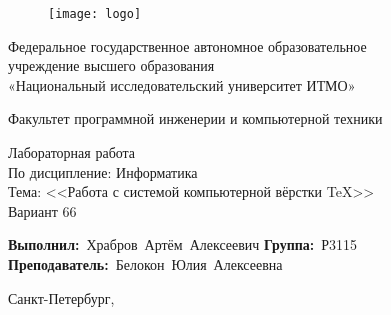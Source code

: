 \newcommand{\Faculty}{Факультет программной инженерии и компьютерной техники}
\newcommand{\TeacherName}{Белокон Юлия Алексеевна}

\newcommand{\LabSubject}{Информатика}
\newcommand{\LabNumber}{\textnumero 6}
\newcommand{\LabName}{Работа с системой компьютерной вёрстки \TeX}
\newcommand{\Variant}{66}

\newcommand{\StudentGroup}{Р3115}
\newcommand{\StudentName}{Храбров Артём Алексеевич}


\thispagestyle{empty}

\begin{figure}[h]
	\centering
	\texttt{[image: logo]}
\end{figure}
\vspace{-\baselineskip}


\begin{center}
	Федеральное государственное автономное образовательное \\
	учреждение высшего образования\\
	«Национальный исследовательский университет ИТМО»
\end{center}\par

\begin{center}
	\vspace{12pt}
	\Faculty
\end{center}\par

\vspace{\fill}
\begin{center}
	Лабораторная работа \LabNumber \\
	По дисципление: \LabSubject \\
	Тема: <<\LabName>> \\
	Вариант \Variant
\end{center}\par

\vspace{\fill}
\vbox{
	\hfill
	\vbox{
		\hbox{\textbf{Выполнил:} \StudentName}
		\hbox{\textbf{Группа:} \StudentGroup \\}
		\hbox{\textbf{Преподаватель:} \TeacherName}
	}
} 


\vspace{\fill}
\begin{center}
	Санкт-Петербург, \the\year{}
\end{center}\par

\newpage